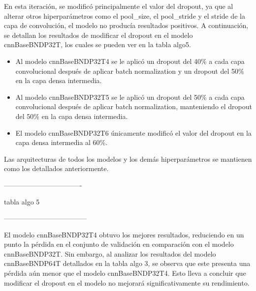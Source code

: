 En esta iteración, se modificó principalmente el valor del dropout, ya que al alterar otros hiperparámetros como el pool\_size, el pool\_stride y el stride de la capa de convolución, el modelo no producía resultados positivos. A continuación, se detallan los resultados de modificar el dropout en el modelo cnnBaseBNDP32T, los cuales se pueden ver en la tabla algo5.

\begin{itemize}

\item Al modelo cnnBaseBNDP32T4 se le aplicó un dropout del 40\% a cada capa convolucional después de aplicar batch normalization y un dropout del 50\% en la capa densa intermedia.

\item Al modelo cnnBaseBNDP32T5 se le aplicó un dropout del 50\% a cada capa convolucional después de aplicar batch normalization, manteniendo el dropout del 50\% en la capa densa intermedia.

\item El modelo cnnBaseBNDP32T6 únicamente modificó el valor del dropout en la capa densa intermedia al 60\%.

\end{itemize}

Las arquitecturas de todos los modelos y los demás hiperparámetros se mantienen como los detallados anteriormente.

----------------------------------

tabla algo 5

------------------------------------

El modelo cnnBaseBNDP32T4 obtuvo los mejores resultados, reduciendo en un punto la pérdida en el conjunto de validación en comparación con el modelo cnnBaseBNDP32T. Sin embargo, al analizar los resultados del modelo cnnBaseBNDP64T detallados en la tabla algo 3, se observa que este presenta una pérdida aún menor que el modelo cnnBaseBNDP32T4. Esto lleva a concluir que modificar el dropout en el modelo no mejorará significativamente su rendimiento.